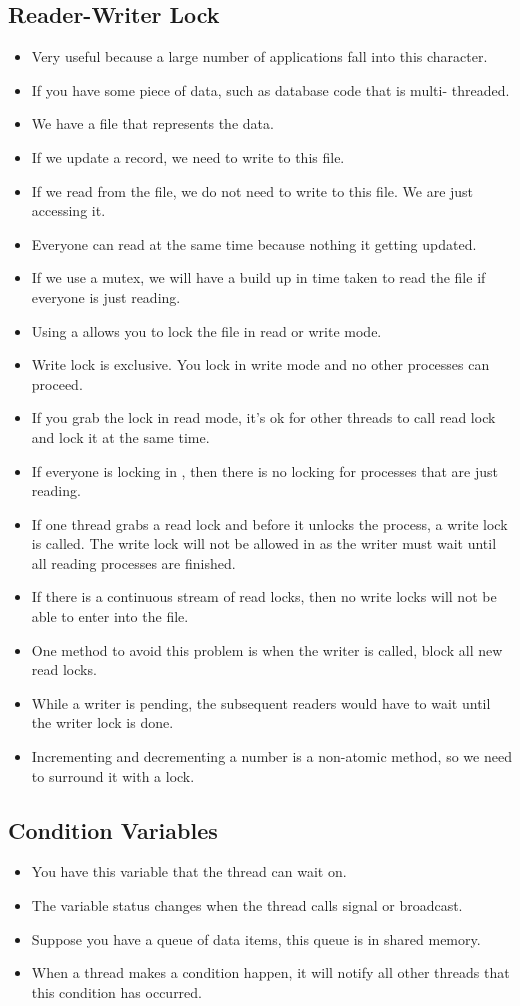 \documentclass[]{article}
\begin{document}
\subsection{Reader-Writer Lock}
\begin{itemize}
\item Very useful because a large number of applications fall into this
character.
\item If you have some piece of data, such as database code that is multi-
threaded.
\item We have a file that represents the data.
\item If we update a record, we need to write to this file.
\item If we read from the file, we do not need to write to this file. We are
just accessing it.
\item Everyone can read at the same time because nothing it getting updated.
\item If we use a mutex, we will have a build up in time taken to read the file
if everyone is just reading.
\item Using a  allows you to lock the file in read or write mode.
\item Write lock is exclusive. You lock in write mode and no other processes can
proceed.
\item If you grab the lock in read mode, it's ok for other threads to call read
lock and lock it at the same time.
\item If everyone is locking in , then there is no locking for
processes that are just reading.
\item If one thread grabs a read lock and before it unlocks the process, a write
lock is called. The write lock will not be allowed in as the writer must wait
until all reading processes are finished.
\item If there is a continuous stream of read locks, then no write locks will
not be able to enter into the file.
\item One method to avoid this problem is when the writer is called, block all
new read locks.
\item While a writer is pending, the subsequent readers would have to wait until
the writer lock is done.
\item Incrementing and decrementing a number is a non-atomic method, so we need
to surround it with a lock.
\end{itemize}

\subsection{Condition Variables}
\begin{itemize}
\item You have this variable that the thread can wait on.
\item The variable status changes when the thread calls signal or broadcast.
\item Suppose you have a queue of data items, this queue is in shared memory.
\item When a thread makes a condition happen, it will notify all other threads
that this condition has occurred.
\end{itemize}
\end{document}
